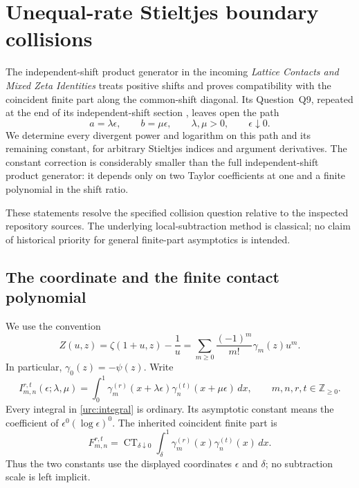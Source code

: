 \documentclass[11pt,a4paper]{article}
\theoremstyle{definition}
\theoremstyle{remark}
\numberwithin{equation}{section}
\begin{document}


\section{Unequal-rate Stieltjes boundary collisions}
\label{urc:section}

The independent-shift product generator in the incoming \emph{Lattice
Contacts and Mixed Zeta Identities} treats positive shifts and proves
compatibility with the coincident finite part along the common-shift
diagonal. Its Question~Q9, repeated at the end of its independent-shift
section \cite[Section~6 and Question~Q9]{LatticeIncoming}, leaves open the path
\[
 a=\lambda\epsilon,\qquad b=\mu\epsilon,\qquad
 \lambda,\mu>0,\qquad \epsilon\downarrow0.
\]
We determine every divergent power and logarithm on this path and its
remaining constant, for arbitrary Stieltjes indices and argument
derivatives. The constant correction is considerably smaller than the
full independent-shift product generator: it depends only on two Taylor
coefficients at one and a finite polynomial in the shift ratio.

These statements resolve the specified collision question relative to
the inspected repository sources. The underlying local-subtraction
method is classical; no claim of historical priority for general
finite-part asymptotics is intended.

\subsection{The coordinate and the finite contact polynomial}

We use the convention
\begin{equation}\label{urc:stieltjes}
 Z(u,z)=\zeta(1+u,z)-\frac1u
       =\sum_{m\ge0}\frac{(-1)^m}{m!}\gamma_m(z)u^m.
\end{equation}
In particular, $\gamma_0(z)=-\psi(z)$. Write
\begin{equation}\label{urc:integral}
 I_{m,n}^{r,t}(\epsilon;\lambda,\mu)
 =\int_0^1\gamma_m^{(r)}(x+\lambda\epsilon)
             \gamma_n^{(t)}(x+\mu\epsilon)\,dx,
 \qquad m,n,r,t\in\mathbb Z_{\ge0}.
\end{equation}
Every integral in \eqref{urc:integral} is ordinary. Its asymptotic
constant means the coefficient of $\epsilon^0(\log\epsilon)^0$.
The inherited coincident finite part is
\begin{equation}\label{urc:finitepart}
 F_{m,n}^{r,t}
 =\operatorname{CT}_{\delta\downarrow0}
    \int_\delta^1\gamma_m^{(r)}(x)\gamma_n^{(t)}(x)\,dx.
\end{equation}
Thus the two constants use the displayed coordinates $\epsilon$ and
$\delta$; no subtraction scale is left implicit.
\end{document}
